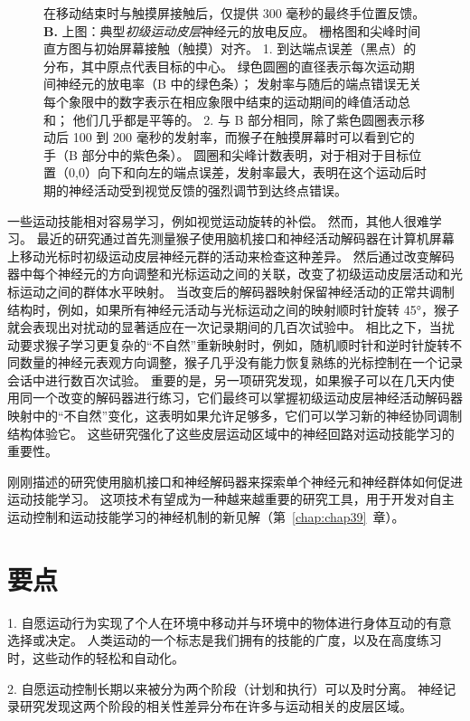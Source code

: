 \begin{figure}[htbp]
{		在移动结束时与触摸屏接触后，仅提供 300 毫秒的最终手位置反馈。
		\textbf{B.} 上图：典型\textit{初级运动皮层}神经元的放电反应。
		栅格图和尖峰时间直方图与初始屏幕接触（触摸）对齐。
		1. 到达端点误差（黑点）的分布，其中原点代表目标的中心。
		绿色圆圈的直径表示每次运动期间神经元的放电率（B 中的绿色条）；
		发射率与随后的端点错误无关
		 每个象限中的数字表示在相应象限中结束的运动期间的峰值活动总和；
		 他们几乎都是平等的。
		 2. 与 B 部分相同，除了紫色圆圈表示移动后 100 到 200 毫秒的发射率，而猴子在触摸屏幕时可以看到它的手（B 部分中的紫色条）。
		 圆圈和尖峰计数表明，对于相对于目标位置（0,0）向下和向左的端点误差，发射率最大，表明在这个运动后时期的神经活动受到视觉反馈的强烈调节到达终点错误。}
	\label{fig:34_25}
\end{figure}


一些运动技能相对容易学习，例如视觉运动旋转的补偿。
然而，其他人很难学习。
最近的研究通过首先测量猴子使用脑机接口和神经活动解码器在计算机屏幕上移动光标时初级运动皮层神经元群的活动来检查这种差异。
然后通过改变解码器中每个神经元的方向调整和光标运动之间的关联，改变了初级运动皮层活动和光标运动之间的群体水平映射。
当改变后的解码器映射保留神经活动的正常共调制结构时，例如，如果所有神经元活动与光标运动之间的映射顺时针旋转 45°，猴子就会表现出对扰动的显著适应在一次记录期间的几百次试验中。
相比之下，当扰动要求猴子学习更复杂的“不自然”重新映射时，例如，随机顺时针和逆时针旋转不同数量的神经元表观方向调整，猴子几乎没有能力恢复熟练的光标控制在一个记录会话中进行数百次试验。
重要的是，另一项研究发现，如果猴子可以在几天内使用同一个改变的解码器进行练习，它们最终可以掌握初级运动皮层神经活动解码器映射中的“不自然”变化，这表明如果允许足够多，它们可以学习新的神经协同调制结构体验它。
这些研究强化了这些皮层运动区域中的神经回路对运动技能学习的重要性。


刚刚描述的研究使用脑机接口和神经解码器来探索单个神经元和神经群体如何促进运动技能学习。
这项技术有望成为一种越来越重要的研究工具，用于开发对自主运动控制和运动技能学习的神经机制的新见解（第~\ref{chap:chap39}~章）。



\section{要点}

1. 自愿运动行为实现了个人在环境中移动并与环境中的物体进行身体互动的有意选择或决定。
人类运动的一个标志是我们拥有的技能的广度，以及在高度练习时，这些动作的轻松和自动化。


2. 自愿运动控制长期以来被分为两个阶段（计划和执行）可以及时分离。
神经记录研究发现这两个阶段的相关性差异分布在许多与运动相关的皮层区域。


